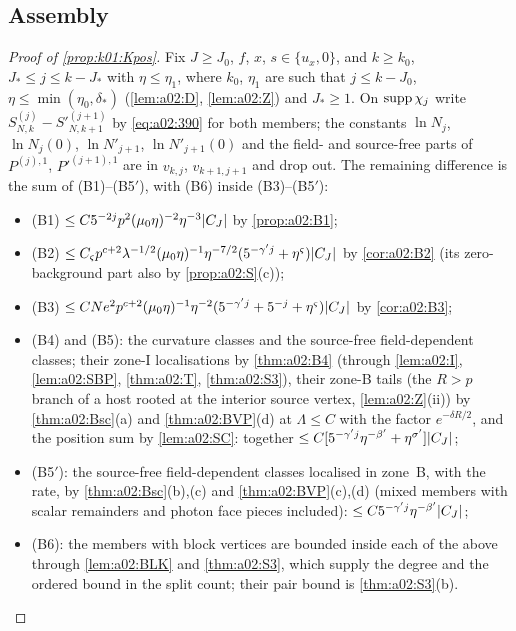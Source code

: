 \subsection{Assembly}\label{ssec:a02:assembly}

\begin{proof}[Proof of \cref{prop:k01:Kpos}]
Fix $J\ge J_0$, $f$, $x$, $s\in\{u_x,0\}$, and $k\ge k_0$, $J_*\le j\le k-J_*$ with $\eta\le\eta_1$, where $k_0$, $\eta_1$ are such that $j\le k-J_0$, $\eta\le\min(\eta_0,\delta_*)$ (\cref{lem:a02:D}, \cref{lem:a02:Z}) and $J_*\ge1$. On $\operatorname{supp}\chi_j$ write $S^{(j)}_{N,k}-S'^{(j+1)}_{N,k+1}$ by \eqref{eq:a02:390} for both members; the constants $\ln N_j$, $\ln N_j(0)$, $\ln N'_{j+1}$, $\ln N'_{j+1}(0)$ and the field- and source-free parts of $P^{(j),1}$, $P'^{(j+1),1}$ are in $v_{k,j}$, $v_{k+1,j+1}$ and drop out. The remaining difference is the sum of (B1)--(B5$'$), with (B6) inside (B3)--(B5$'$):
\begin{itemize}[nosep]
\item (B1) $\le C5^{-2j}p^2(\mu_0\eta)^{-2}\eta^{-3}|C_J|$ by \cref{prop:a02:B1};
\item (B2) $\le C_\varsigma p^{c+2}\lambda^{-1/2}(\mu_0\eta)^{-1}\eta^{-7/2}(5^{-\gamma'j}+\eta^\varsigma)|C_J|$ by \cref{cor:a02:B2} (its zero-background part also by \cref{prop:a02:S}(c));
\item (B3) $\le CNe^2p^{c+2}(\mu_0\eta)^{-1}\eta^{-2}(5^{-\gamma'j}+5^{-j}+\eta^\varsigma)|C_J|$ by \cref{cor:a02:B3};
\item (B4) and (B5): the curvature classes and the source-free field-dependent classes; their zone-I localisations by \cref{thm:a02:B4} (through \cref{lem:a02:I}, \cref{lem:a02:SBP}, \cref{thm:a02:T}, \cref{thm:a02:S3}), their zone-B tails (the $R>p$ branch of a host rooted at the interior source vertex, \cref{lem:a02:Z}(ii)) by \cref{thm:a02:Bsc}(a) and \cref{thm:a02:BVP}(d) at $\Lambda\le C$ with the factor $e^{-\delta R/2}$, and the position sum by \cref{lem:a02:SC}: together $\le C[5^{-\gamma'j}\eta^{-\beta'}+\eta^{\sigma'}]|C_J|$;
\item (B5$'$): the source-free field-dependent classes localised in zone~B, with the rate, by \cref{thm:a02:Bsc}(b),(c) and \cref{thm:a02:BVP}(c),(d) (mixed members with scalar remainders and photon face pieces included): $\le C5^{-\gamma'j}\eta^{-\beta'}|C_J|$;
\item (B6): the members with block vertices are bounded inside each of the above through \cref{lem:a02:BLK} and \cref{thm:a02:S3}, which supply the degree and the ordered bound in the split count; their pair bound is \cref{thm:a02:S3}(b).

\end{itemize}
\end{proof}
